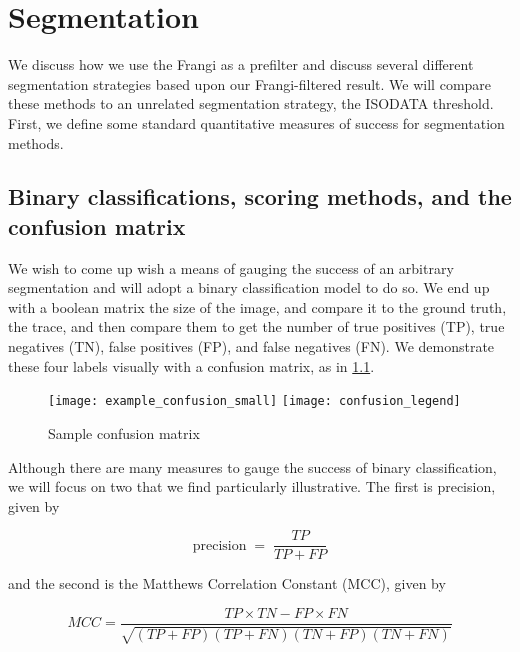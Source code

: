 \chapter{Segmentation} \label{ch:segmentation}

We discuss how we use the Frangi as a prefilter and discuss several different segmentation strategies based upon our Frangi-filtered result. We will compare these methods to an unrelated segmentation strategy, the ISODATA threshold. First, we define some standard quantitative measures of success for segmentation methods.


\section{Binary classifications, scoring methods, and the confusion matrix}

We wish to come up wish a means of gauging the success of an arbitrary segmentation and will adopt a binary classification model to do so.
We end up with a boolean matrix the size of the image, and compare it to the ground truth, the trace, and then compare them to get the number of true positives (TP), true negatives (TN), false positives (FP), and false negatives (FN). We demonstrate these four labels visually with a confusion matrix, as in \cref{fig:sample-confusion}.
 
\begin{figure}
  \centering
  \texttt{[image: example\_confusion\_small]}
  \texttt{[image: confusion\_legend]}
  \caption{Sample confusion matrix}
  \label{fig:sample-confusion}
\end{figure}

Although there are many measures to gauge the success of binary classification, we will focus on two that we find particularly illustrative. The first is precision, given by

\begin{equation}
\label{eq:precision}
\textrm{precision} \;=\; \frac{TP}{TP+FP}
\end{equation}

and the second is the Matthews Correlation Constant (MCC), given by

\begin{equation} \label{eq:MCC}
MCC = \frac{TP\times TN - FP \times FN}{\sqrt{ (TP + FP)(TP+FN)(TN+FP)(TN+FN)}}
\end{equation}

